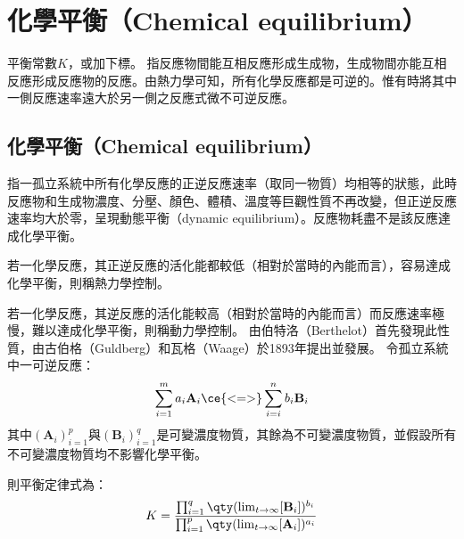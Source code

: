 \documentclass[a4paper,12pt]{report}
\begin{document}
\section{化學平衡（Chemical equilibrium）}
平衡常數$K$，或加下標。
指反應物間能互相反應形成生成物，生成物間亦能互相反應形成反應物的反應。由熱力學可知，所有化學反應都是可逆的。惟有時將其中一側反應速率遠大於另一側之反應式微不可逆反應。
\subsection{化學平衡（Chemical equilibrium）}
指一孤立系統中所有化學反應的正逆反應速率（取同一物質）均相等的狀態，此時反應物和生成物濃度、分壓、顏色、體積、溫度等巨觀性質不再改變，但正逆反應速率均大於零，呈現動態平衡（dynamic equilibrium）。反應物耗盡不是該反應達成化學平衡。
\bit
\item 若一化學反應，其正逆反應的活化能都較低（相對於當時的內能而言），容易達成化學平衡，則稱熱力學控制。
\item 若一化學反應，其逆反應的活化能較高（相對於當時的內能而言）而反應速率極慢，難以達成化學平衡，則稱動力學控制。
\eit
{}
由伯特洛（Berthelot）首先發現此性質，由古伯格（Guldberg）和瓦格（Waage）於1893年提出並發展。
令孤立系統中一可逆反應：
\[\sum_{i=1}^ma_i\mathbf{A}_i\ce{<=>}\sum_{i=i}^nb_i\mathbf{B}_i\]
其中$(\mathbf{A}_i)_{i=1}^p$與$(\mathbf{B}_i)_{i=1}^q$是可變濃度物質，其餘為不可變濃度物質，並假設所有不可變濃度物質均不影響化學平衡。

則平衡定律式為：
\[K=\frac{\prod_{i=1}^q\qty(\lim_{t\to\infty}[\mathbf{B}_i])^{b_i}}{\prod_{i=1}^p\qty(\lim_{t\to\infty}[\mathbf{A}_i])^{a_i}}\]
\end{document}
